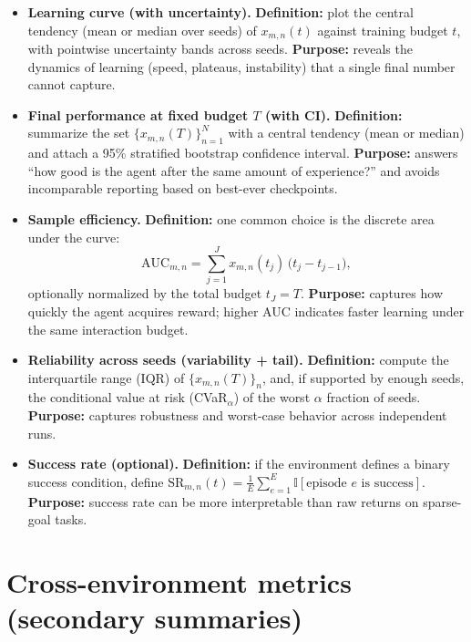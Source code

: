 \begin{itemize}

\item \textbf{Learning curve (with uncertainty).}  
  \textbf{Definition:} plot the central tendency (mean or median over seeds) of $x_{m,n}(t)$
  against training budget $t$, with pointwise uncertainty bands across seeds.  
  \textbf{Purpose:} reveals the dynamics of learning (speed, plateaus, instability) that a
  single final number cannot capture.

\item \textbf{Final performance at fixed budget $T$ (with CI).}  
  \textbf{Definition:} summarize the set $\{x_{m,n}(T)\}_{n=1}^N$ with a central tendency
  (mean or median) and attach a 95\% stratified bootstrap confidence interval.  
  \textbf{Purpose:} answers ``how good is the agent after the same amount of experience?''
  and avoids incomparable reporting based on best-ever checkpoints. \cite{agarwal2021precipice}

\item \textbf{Sample efficiency.}  
  \textbf{Definition:} one common choice is the discrete area under the curve:
  \[
    \mathrm{AUC}_{m,n}=\sum_{j=1}^{J}x_{m,n}(t_j)\,\bigl(t_j-t_{j-1}\bigr),
  \]
  optionally normalized by the total budget $t_J=T$.  
  \textbf{Purpose:} captures how quickly the agent acquires reward; higher AUC indicates
  faster learning under the same interaction budget.

\item \textbf{Reliability across seeds (variability + tail).}  
  \textbf{Definition:} compute the interquartile range (IQR) of $\{x_{m,n}(T)\}_n$, and, if
  supported by enough seeds, the conditional value at risk (CVaR$_\alpha$) of the worst
  $\alpha$ fraction of seeds.  
  \textbf{Purpose:} captures robustness and worst-case behavior across independent runs.
  \cite{chan2020reliability}

\item \textbf{Success rate (optional).}  
  \textbf{Definition:} if the environment defines a binary success condition, define
  $\mathrm{SR}_{m,n}(t)=\frac{1}{E}\sum_{e=1}^E\mathbb{I}[\text{episode $e$ is success}]$.  
  \textbf{Purpose:} success rate can be more interpretable than raw returns on sparse-goal tasks.

\end{itemize}

\section{Cross-environment metrics (secondary summaries)}

